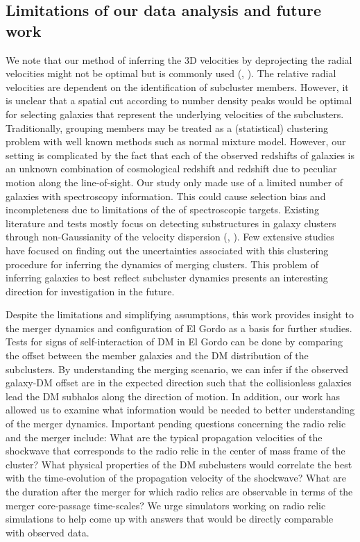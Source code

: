 \subsection{Limitations of our data analysis and future work} 
We note that our method of inferring the 3D velocities by deprojecting the
radial velocities might not be optimal but is commonly used (,
\citealt{Dawson12}). The relative
radial velocities are dependent on the identification of subcluster members.
However, it is unclear that a spatial
cut according to number density peaks would be optimal for selecting
galaxies that represent the underlying velocities of the subclusters. Traditionally, grouping members
may be treated as a (statistical) clustering problem with well known
methods such as normal mixture model. However, our setting is complicated
by the fact that each of the observed redshifts of galaxies is an unknown
combination of cosmological redshift and redshift due to peculiar motion
along the line-of-sight. Our study only made use of a limited number of
galaxies with spectroscopy information. This could cause selection bias and
incompleteness due to limitations of the of spectroscopic targets. Existing
literature and tests mostly focus on detecting substructures in galaxy
clusters through non-Gaussianity of the velocity dispersion
(\citealt{Dressler88}, \citealt{Einasto12}). Few extensive studies have focused on finding out the uncertainties
associated with this clustering procedure for inferring the dynamics of
merging clusters. This problem of inferring galaxies to best reflect
subcluster dynamics presents an interesting direction for investigation in the future.   
 
Despite the limitations and simplifying assumptions, this work provides
insight to the merger dynamics and configuration of El Gordo as a basis for further studies.
Tests for signs of self-interaction of DM in El Gordo  can be done
by comparing the offset between the member galaxies and the
DM distribution of the subclusters. By understanding the merging scenario,
we can infer if the observed galaxy-DM offset are in the expected
direction such that the collisionless galaxies lead the DM subhalos along
the direction of motion. In addition, our work has allowed us to examine
what information would be needed to better understanding of the merger
dynamics. Important pending questions concerning the radio relic and the
merger  include:  What are the typical propagation velocities of the shockwave that
corresponds to the radio relic in the	center of mass frame of the cluster?
What physical properties of the DM subclusters would correlate the best with the
time-evolution of the propagation velocity of the shockwave?  What are the duration
after the merger for which radio relics are observable in terms of the merger
core-passage time-scales? We urge simulators working on radio relic
simulations to help come up with answers that would be directly
comparable with observed data. \par 

